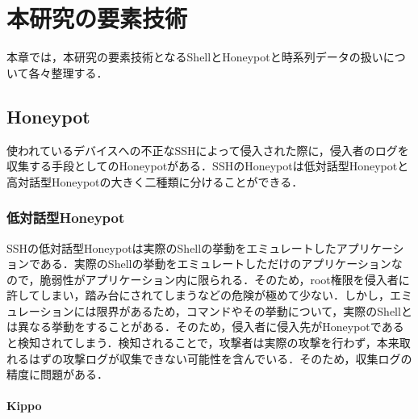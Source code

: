 \chapter{本研究の要素技術}
\label{tech}

本章では，本研究の要素技術となるShellとHoneypotと時系列データの扱いについて各々整理する．

\section{Honeypot}

使われているデバイスへの不正なSSHによって侵入された際に，侵入者のログを収集する手段としてのHoneypotがある．SSHのHoneypot\cite{honeypot}は低対話型Honeypotと高対話型Honeypotの大きく二種類に分けることができる．\\


\subsection{低対話型Honeypot}
\label{tech:LowInteractionHoneypot}

SSHの低対話型Honeypotは実際のShellの挙動をエミュレートしたアプリケーションである．実際のShellの挙動をエミュレートしただけのアプリケーションなので，脆弱性がアプリケーション内に限られる．そのため，root権限を侵入者に許してしまい，踏み台にされてしまうなどの危険が極めて少ない．しかし，エミュレーションには限界があるため，コマンドやその挙動について，実際のShellとは異なる挙動をすることがある．そのため，侵入者に侵入先がHoneypotであると検知されてしまう．検知されることで，攻撃者は実際の攻撃を行わず，本来取れるはずの攻撃ログが収集できない可能性を含んでいる．そのため，収集ログの精度に問題がある．

\subsubsection{Kippo}
\label{tech:Kippo}

